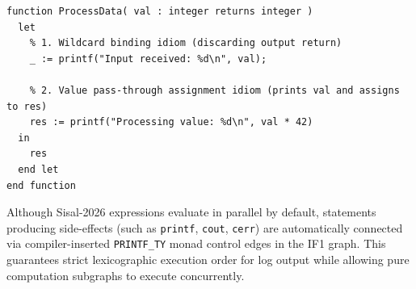 \begin{lstlisting}[caption={\texttt{printf} Binding Patterns}]
function ProcessData( val : integer returns integer )
  let
    % 1. Wildcard binding idiom (discarding output return)
    _ := printf("Input received: %d\n", val);
    
    % 2. Value pass-through assignment idiom (prints val and assigns to res)
    res := printf("Processing value: %d\n", val * 42)
  in
    res
  end let
end function
\end{lstlisting}

\begin{note}
Although Sisal-2026 expressions evaluate in parallel by default, statements producing side-effects (such as \texttt{printf}, \texttt{cout}, \texttt{cerr}) are automatically connected via compiler-inserted \texttt{PRINTF\_TY} monad control edges in the IF1 graph. This guarantees strict lexicographic execution order for log output while allowing pure computation subgraphs to execute concurrently.
\end{note}
